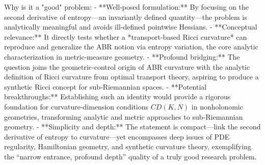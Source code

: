 Why is it a "good" problem:  
- **Well‑posed formulation:** By focusing on the second derivative of entropy—an invariantly defined quantity—the problem is analytically meaningful and avoids ill‑defined pointwise Hessians.  
- **Conceptual relevance:** It directly tests whether a *transport‑based Ricci curvature* can reproduce and generalize the ABR notion via entropy variation, the core analytic characterization in metric‑measure geometry.  
- **Profound bridging:** The question joins the geometric‑control origin of ABR curvature with the analytic definition of Ricci curvature from optimal transport theory, aspiring to produce a synthetic Ricci concept for sub‑Riemannian spaces.  
- **Potential breakthroughs:** Establishing such an identity would provide a rigorous foundation for curvature‑dimension conditions \(CD(K,N)\) in nonholonomic geometries, transforming analytic and metric approaches to sub‑Riemannian geometry.  
- **Simplicity and depth:** The statement is compact—link the second derivative of entropy to curvature—yet encompasses deep issues of PDE regularity, Hamiltonian geometry, and synthetic curvature theory, exemplifying the “narrow entrance, profound depth” quality of a truly good research problem.